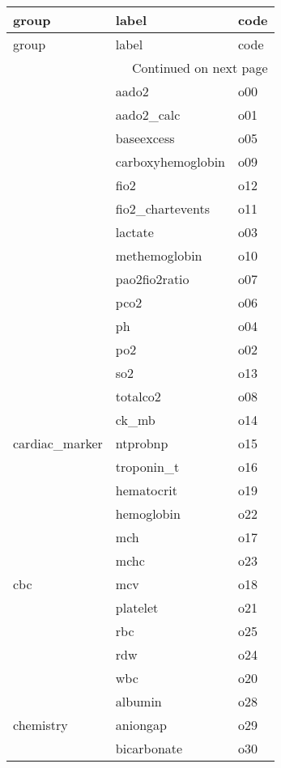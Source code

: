 \begin{longtable}{lll}
\toprule
group & label & code \\
\midrule
\endfirsthead
\toprule
group & label & code \\
\midrule
\endhead
\midrule
\multicolumn{3}{r}{Continued on next page} \\
\midrule
\endfoot
\bottomrule
\endlastfoot
\multirow[t]{14}{*}{blood_gas} & aado2 & o00 \\
\cline{2-3}
 & aado2_calc & o01 \\
\cline{2-3}
 & baseexcess & o05 \\
\cline{2-3}
 & carboxyhemoglobin & o09 \\
\cline{2-3}
 & fio2 & o12 \\
\cline{2-3}
 & fio2_chartevents & o11 \\
\cline{2-3}
 & lactate & o03 \\
\cline{2-3}
 & methemoglobin & o10 \\
\cline{2-3}
 & pao2fio2ratio & o07 \\
\cline{2-3}
 & pco2 & o06 \\
\cline{2-3}
 & ph & o04 \\
\cline{2-3}
 & po2 & o02 \\
\cline{2-3}
 & so2 & o13 \\
\cline{2-3}
 & totalco2 & o08 \\
\cline{1-3} \cline{2-3}
\multirow[t]{3}{*}{cardiac_marker} & ck_mb & o14 \\
\cline{2-3}
 & ntprobnp & o15 \\
\cline{2-3}
 & troponin_t & o16 \\
\cline{1-3} \cline{2-3}
\multirow[t]{9}{*}{cbc} & hematocrit & o19 \\
\cline{2-3}
 & hemoglobin & o22 \\
\cline{2-3}
 & mch & o17 \\
\cline{2-3}
 & mchc & o23 \\
\cline{2-3}
 & mcv & o18 \\
\cline{2-3}
 & platelet & o21 \\
\cline{2-3}
 & rbc & o25 \\
\cline{2-3}
 & rdw & o24 \\
\cline{2-3}
 & wbc & o20 \\
\cline{1-3} \cline{2-3}
\multirow[t]{11}{*}{chemistry} & albumin & o28 \\
\cline{2-3}
 & aniongap & o29 \\
\cline{2-3}
 & bicarbonate & o30 \\

\end{longtable}
